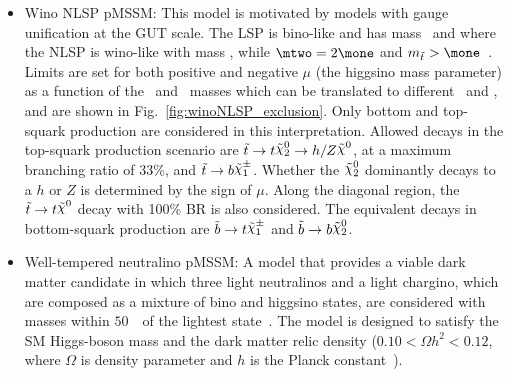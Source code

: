 \begin{itemize}
	 \item Wino NLSP pMSSM: This model is motivated by models with gauge unification at the GUT scale. The LSP is bino-like and has mass \mone\ and where the NLSP is wino-like with mass \mtwo, while $\mtwo=2\mone$ and $\mstop>\mone$~\cite{naturalSUSY}. Limits are set for both positive and negative $\mu$ (the higgsino mass parameter) as a function of the \stop\ and \ninoone\ masses which can be translated to different \mone\ and \mqlthree, and are shown in Fig.~\ref{fig:winoNLSP_exclusion}. Only bottom and top-squark production are considered in this interpretation. Allowed decays in the top-squark production scenario are $\stop\to t \ninotwo\to h/Z \LSP$, at a maximum branching ratio of 33\%, and $\stop \to b \chinoonepm$. Whether the $\ninotwo$ dominantly decays to a $h$ or $Z$ is determined by the sign of $\mu$. Along the diagonal region, the $\stop\to t\LSP$ decay with 100\% BR is also considered. The equivalent decays in bottom-squark production are $\sbottom\to t\chinoonepm$ and $\sbottom\to b\ninotwo$. %

	\item Well-tempered neutralino pMSSM: A model that provides a viable dark matter candidate in which three light neutralinos and a light chargino, which are composed as a mixture of bino and higgsino states, are considered with masses within $50$~\GeV\ of the lightest state~\cite{atlasDM,wellTemp}. The model is designed to satisfy the SM Higgs-boson mass and the dark matter relic density ($0.10<\Omega h^{2}<0.12$, where $\Omega$ is density parameter and $h$ is the Planck constant~\cite{relic_density}).%
\end{itemize}

